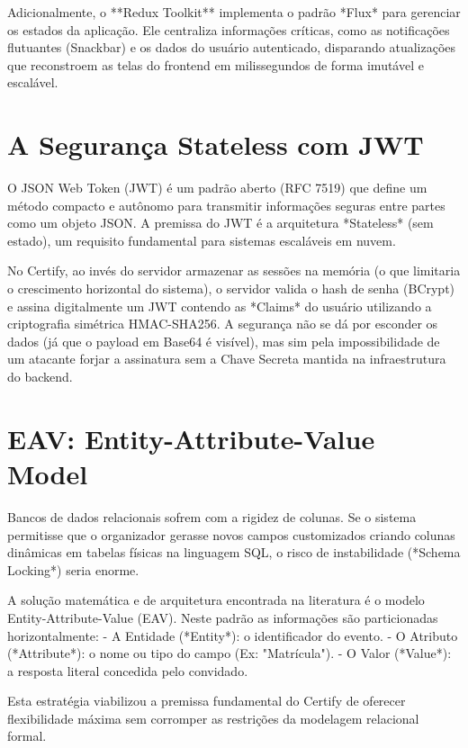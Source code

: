 Adicionalmente, o **Redux Toolkit** implementa o padrão *Flux* para gerenciar os estados da aplicação. Ele centraliza informações críticas, como as notificações flutuantes (Snackbar) e os dados do usuário autenticado, disparando atualizações que reconstroem as telas do frontend em milissegundos de forma imutável e escalável.

\section{A Segurança Stateless com JWT}

O JSON Web Token (JWT) é um padrão aberto (RFC 7519) que define um método compacto e autônomo para transmitir informações seguras entre partes como um objeto JSON. A premissa do JWT é a arquitetura *Stateless* (sem estado), um requisito fundamental para sistemas escaláveis em nuvem. 

No Certify, ao invés do servidor armazenar as sessões na memória (o que limitaria o crescimento horizontal do sistema), o servidor valida o hash de senha (BCrypt) e assina digitalmente um JWT contendo as *Claims* do usuário utilizando a criptografia simétrica HMAC-SHA256. A segurança não se dá por esconder os dados (já que o payload em Base64 é visível), mas sim pela impossibilidade de um atacante forjar a assinatura sem a Chave Secreta mantida na infraestrutura do backend.

\section{EAV: Entity-Attribute-Value Model}

Bancos de dados relacionais sofrem com a rigidez de colunas. Se o sistema permitisse que o organizador gerasse novos campos customizados criando colunas dinâmicas em tabelas físicas na linguagem SQL, o risco de instabilidade (*Schema Locking*) seria enorme. 

A solução matemática e de arquitetura encontrada na literatura é o modelo Entity-Attribute-Value (EAV). Neste padrão as informações são particionadas horizontalmente:
- A Entidade (*Entity*): o identificador do evento.
- O Atributo (*Attribute*): o nome ou tipo do campo (Ex: "Matrícula").
- O Valor (*Value*): a resposta literal concedida pelo convidado.

Esta estratégia viabilizou a premissa fundamental do Certify de oferecer flexibilidade máxima sem corromper as restrições da modelagem relacional formal.

